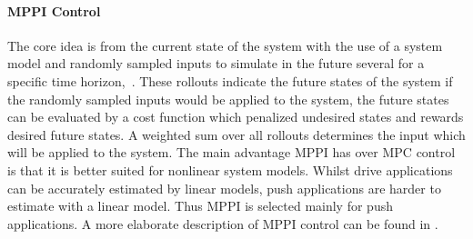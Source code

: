 \paragraph{\acl{MPPI} Control}
The core idea is from the current state of the system with the use of a system model and randomly sampled inputs to simulate in the future several  for a specific time horizon,~\cite{neuromorphictutorial_ltc21_2021}. These rollouts indicate the future states of the system if the randomly sampled inputs would be applied to the system, the future states can be evaluated by a cost function which penalized undesired states and rewards desired future states. A weighted sum over all rollouts determines the input which will be applied to the system. The main advantage \ac{MPPI} has over \ac{MPC} control is that it is better suited for nonlinear system models. Whilst drive applications can be accurately estimated by linear models, push applications are harder to estimate with a linear model. Thus \ac{MPPI} is selected mainly for push applications. A more elaborate description of \ac{MPPI} control can be found in .\bs

%
%

